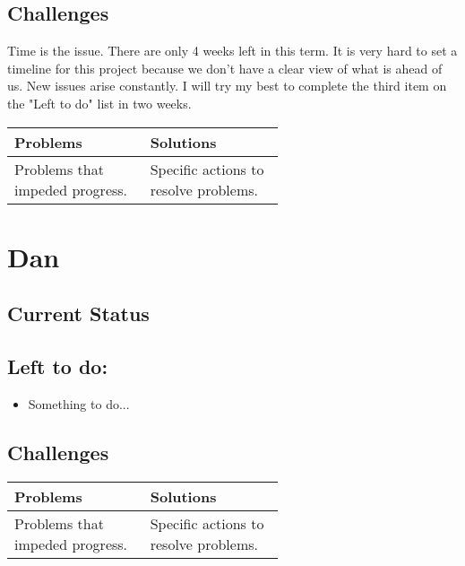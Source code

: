 \documentclass[compsoc,draftclsnofoot,onecolumn,10pt]{IEEEtran}
\begin{document}
\subsection{Challenges}
	Time is the issue. There are only 4 weeks left in this term. It is very hard to set a timeline for this project because we don't have a clear view of what is ahead of us. New issues arise constantly. I will try my best to complete the third item on the "Left to do" list in two weeks. 
\begin{tabular}{|p{0.3\linewidth}|p{0.3\linewidth}|}
	\hline
	\textbf{Problems} & \textbf{Solutions}\\
	\hline
	Problems that impeded progress. & Specific actions to resolve problems.\\
	\hline
	
\end{tabular}

\section{Dan}
\subsection{Current Status}

\subsection{Left to do:}
\begin{itemize}
	\item Something to do...
\end{itemize}
\subsection{Challenges}

\begin{tabular}{|p{0.3\linewidth}|p{0.3\linewidth}|}
	\hline
	\textbf{Problems} & \textbf{Solutions}\\
	\hline	
	Problems that impeded progress. & Specific actions to resolve problems.\\
	\hline
	
\end{tabular}
\end{document}
